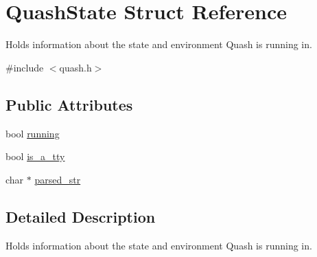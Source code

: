 \hypertarget{structQuashState}{\section{Quash\-State Struct Reference}
\label{structQuashState}
}


Holds information about the state and environment Quash is running in.  




{\ttfamily \#include $<$quash.\-h$>$}

\subsection*{Public Attributes}
\begin{DoxyCompactItemize}
\item 
bool \hyperlink{structQuashState_a7db3a718696ee9d0c7f8b649ccb88bb4}{running}
\item 
bool \hyperlink{structQuashState_a6d92242ecd91c33779ea2deae58956bf}{is\-\_\-a\-\_\-tty}
\item 
char $\ast$ \hyperlink{structQuashState_a69d0ad3cb3bf44a92459020d98814f7e}{parsed\-\_\-str}
\end{DoxyCompactItemize}


\subsection{Detailed Description}
Holds information about the state and environment Quash is running in. 

